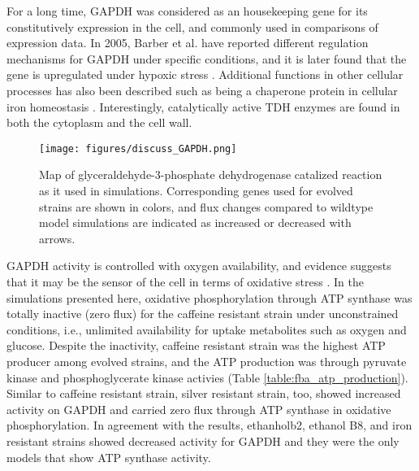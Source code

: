 For a long time, GAPDH was considered as an housekeeping gene for its constitutively expression in the cell, and commonly used in comparisons of expression data. In 2005, Barber et al. have reported different regulation mechanisms for GAPDH under specific conditions\cite{barber2005gapdh}, and it is later found that the gene is upregulated under hypoxic stress \cite{yang2008effects}. Additional functions in other cellular processes has also been described such as being a chaperone protein in cellular iron homeostasis \cite{sweeny2018glyceraldehyde}. Interestingly, catalytically active TDH enzymes are found in both the cytoplasm and the cell wall.

\begin{figure}[H]
\texttt{[image: figures/discuss\_GAPDH.png]}
\caption[Map of glyceraldehyde-3-phosphate dehydrogenase catalized reaction as it used in simulations]{Map of glyceraldehyde-3-phosphate dehydrogenase catalized reaction as it used in simulations. Corresponding genes used for evolved strains are shown in colors, and flux changes compared to wildtype model simulations are indicated as increased or decreased with arrows.}
\label{fig:discuss_GAPDH}
\end{figure}

GAPDH activity is controlled with oxygen availability, and evidence suggests that it may be the sensor of the cell in terms of oxidative stress \cite{chuang2005glyceraldehyde}. In the simulations presented here, oxidative phosphorylation through ATP synthase was totally inactive (zero flux) for the caffeine resistant strain under unconstrained conditions, i.e., unlimited availability for uptake metabolites such as oxygen and glucose. Despite the inactivity, caffeine resistant strain was the highest ATP producer among evolved strains, and the ATP production was through pyruvate kinase and phosphoglycerate kinase activies (Table \ref{table:fba_atp_production}). Similar to caffeine resistant strain, silver resistant strain, too, showed increased activity on GAPDH and carried zero flux through ATP synthase in oxidative phosphorylation. In agreement with the results, ethanholb2, ethanol B8, and iron resistant strains showed decreased activity for GAPDH and they were the only models that show ATP synthase activity.

